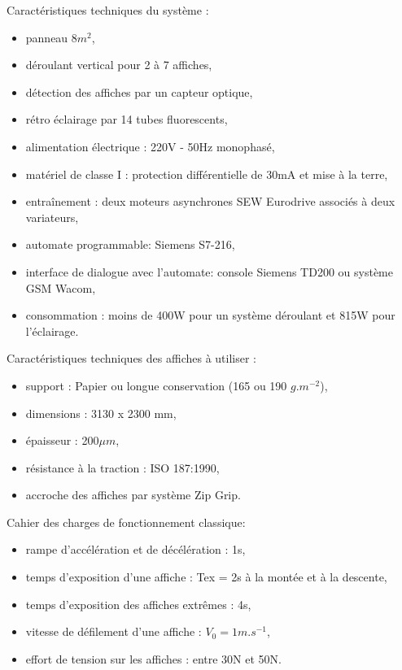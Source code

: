 Caractéristiques techniques du système :
\begin{itemize}
 \item panneau $8m^2$,
 \item déroulant vertical pour 2 à 7 affiches,
 \item détection des affiches par un capteur optique,
 \item rétro éclairage par 14 tubes fluorescents,
 \item alimentation électrique : 220V - 50Hz monophasé,
 \item matériel de classe I : protection différentielle de 30mA et mise à la terre,
 \item entraînement : deux moteurs asynchrones SEW Eurodrive associés à deux variateurs,
 \item automate programmable: Siemens S7-216,
 \item interface de dialogue avec l'automate: console Siemens TD200 ou système GSM Wacom,
 \item consommation : moins de 400W pour un système déroulant et 815W pour l'éclairage.
\end{itemize}

Caractéristiques techniques des affiches à utiliser :
\begin{itemize}
 \item support : Papier ou longue conservation (165 ou 190 $g.m^{-2}$),
 \item dimensions : 3130 x 2300 mm,
 \item épaisseur : 200$\mu m$,
 \item résistance à la traction : ISO 187:1990,
 \item accroche des affiches par système Zip Grip.
\end{itemize}

Cahier des charges de fonctionnement classique:
\begin{itemize}
 \item rampe d'accélération et de décélération : 1s,
 \item temps d'exposition d'une affiche : Tex = 2s à la montée et à la descente,
 \item temps d'exposition des affiches extrêmes : 4s,
 \item vitesse de défilement d'une affiche : $V_0=1m.s^{-1}$,
 \item effort de tension sur les affiches : entre 30N et 50N.
 \end{itemize}

\newpage

